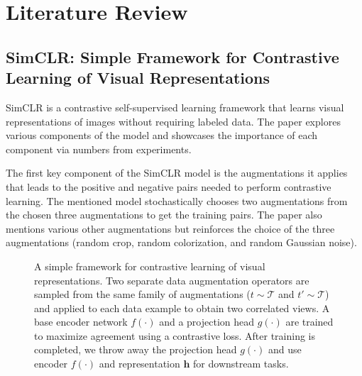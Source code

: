 \section{Literature Review}
\label{sec:related_work}

\subsection{SimCLR: Simple Framework for Contrastive Learning of Visual Representations}

SimCLR\cite{chen2020simple} is a contrastive self-supervised learning framework that learns visual representations of images without requiring labeled data. The paper explores various components of the model and showcases the importance of each component via numbers from experiments.

The first key component of the SimCLR model is the augmentations it applies that leads to the positive and negative pairs needed to perform contrastive learning. The mentioned model stochastically chooses two augmentations from the chosen three augmentations to get the training pairs. The paper also mentions various other augmentations but reinforces the choice of the three augmentations (random crop, random colorization, and random Gaussian noise).

\begin{figure}[h]
\small
    \centering
{}
    \caption{A simple framework for contrastive learning of visual representations. 
    Two separate data augmentation operators are sampled from the same family of augmentations ($t\sim \mathcal{T}$ and $t'\sim \mathcal{T}$) and applied to each data example to obtain two correlated views.
    A base encoder network $f(\cdot)$ and a projection head $g(\cdot)$ are trained to maximize agreement using a contrastive loss. After training is completed, we throw away the projection head $g(\cdot)$ and use encoder $f(\cdot)$ and representation $\bm h$ for downstream tasks.}
    \label{fig:framework}
\end{figure}


